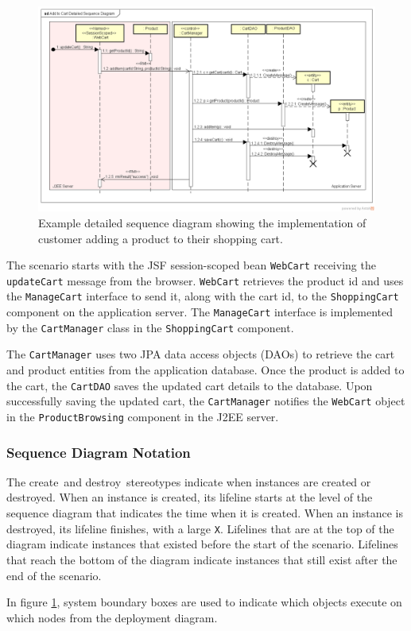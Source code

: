 \begin{figure}[h!]
    \centering
    \begin{adjustwidth}{-11mm}{-11mm}
        \includegraphics[trim=35 70 31 49,clip,width=0.98\paperwidth]{images/uml/detailed_sequence_diagram.png}
    \end{adjustwidth}
    \caption{Example detailed sequence diagram showing the implementation of customer adding a product to their shopping cart.}
    \label{fig:detailedSequenceDiagram}
\end{figure}

\noindent
The scenario starts with the JSF session-scoped bean \texttt{WebCart} receiving the \texttt{updateCart} message from the browser.
\texttt{WebCart} retrieves the product id and uses the \texttt{ManageCart} interface to send it, along with the cart id,
to the \texttt{ShoppingCart} component on the application server.
The \texttt{ManageCart} interface is implemented by the \texttt{CartManager} class in the \texttt{ShoppingCart} component.

The \texttt{CartManager} uses two JPA data access objects (DAOs) to retrieve the cart and product entities from the application database.
Once the product is added to the cart, the \texttt{CartDAO} saves the updated cart details to the database.
Upon successfully saving the updated cart, the \texttt{CartManager} notifies the \texttt{WebCart}
object in the \texttt{ProductBrowsing} component in the J2EE server.

\subsubsection{Sequence Diagram Notation}
The \guillemotleft create\guillemotright~and \guillemotleft destroy\guillemotright~stereotypes indicate when instances are created or destroyed.
When an instance is created, its lifeline starts at the level of the sequence diagram that indicates the time when it is created.
When an instance is destroyed, its lifeline finishes, with a large \texttt{X}.
Lifelines that are at the top of the diagram indicate instances that existed before the start of the scenario.
Lifelines that reach the bottom of the diagram indicate instances that still exist after the end of the scenario.

In figure \ref{fig:detailedSequenceDiagram}, system boundary boxes are used to indicate which objects execute on which nodes from the deployment diagram.
